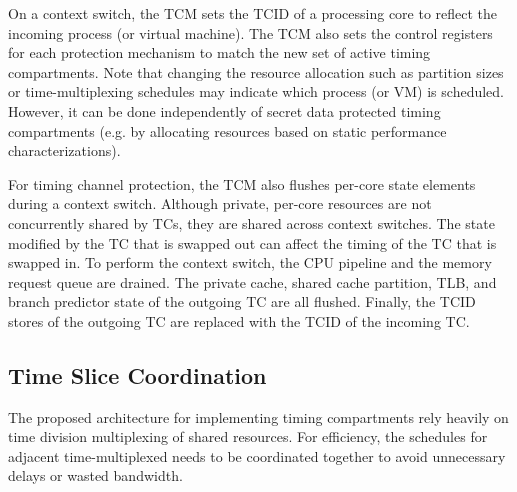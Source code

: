 On a context switch, the TCM sets the TCID of a processing core to reflect
the incoming process (or virtual machine). The TCM also sets the control
registers for each protection mechanism to match the new set of active
timing compartments. Note that changing the resource allocation such as
partition sizes or time-multiplexing schedules may indicate
which process (or VM) is scheduled. However, it can be done independently
of secret data protected timing compartments (e.g. by allocating resources 
based on static performance characterizations).

For timing channel protection, the TCM also flushes per-core state elements
during a context switch.
Although private, per-core resources are not concurrently shared by TCs, they 
are shared across context switches. The state modified by the TC that is 
swapped out can affect the timing of the TC that is swapped in.
To perform the context switch, the CPU pipeline and the memory request queue 
are drained. 
The private cache, shared cache 
partition, TLB, and branch predictor state of the outgoing TC are all flushed.  
Finally, the TCID stores of the outgoing TC are replaced with the TCID of the 
incoming TC. 


\subsection{Time Slice Coordination}
\label{sec:coordination}

The proposed architecture for implementing timing compartments rely heavily on
time division multiplexing of shared resources. For efficiency, the schedules
for adjacent time-multiplexed needs to be coordinated together to avoid 
unnecessary delays or wasted bandwidth.

